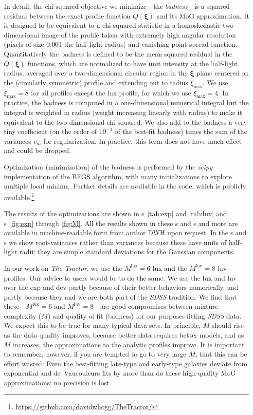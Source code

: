\documentclass[12pt,pdftex,preprint]{aastex}
\newcommand{\project}[1]{\textsl{#1}}
\newcommand{\tvector}[1]{\boldsymbol{#1}}
\newcommand{\spos}{\tvector{\xi}}
\newcommand{\lux}{\mathrm{lux}}
\newcommand{\luv}{\mathrm{luv}}
\begin{document}
In detail, the chi-squared objective we minimize---the
\emph{badness}---is a squared residual between the exact profile
function $Q(\spos)$ and its MoG approximation.  It is designed to be
equivalent to a chi-squared statistic in a homoskedastic
two-dimensional image of the profile taken with extremely high angular
resolution (pixels of size 0.001 the half-light radius) and vanishing
point-spread function.  Quantitatively the badness is defined to be
the mean squared residual in the $Q(\spos)$ functions, which are
normalized to have unit intensity at the half-light radius, averaged
over a two-dimensional circular region in the $\spos$ plane centered
on the (circularly symmetric) profile and extending out to radius
$\xi_{\max}$.  We use $\xi_{\max}=8$ for all profiles except the
$\lux$ profile, for which we use $\xi_{\max}=4$.  In practice, the
badness is computed in a one-dimensional numerical integral but the
integral is weighted in radius (weight increasing linearly with
radius) to make it equivalent to the two-dimensional chi-squared.  We
also add to the badness a very tiny coefficient (on the order of
$10^{-3}$ of the best-fit badness) times the sum of the variances
$v_m$ for regularization.  In practice, this term does not have much
effect and could be dropped.

Optimization (minimization) of the badness is performed by the
\project{scipy} implementation of the BFGS algorithm, with many
initializations to explore multiple local minima.  Further details are
available in the code, which is publicly
available.\footnote{\url{https://github.com/davidwhogg/TheTractor/}}

The results of the optimizations are shown in \tablename
s~\ref{tab:exp} and \ref{tab:lux} and \figurename s~\ref{fig:exp}
through \ref{fig:M}.  All the results shown in these \figurename s and
\tablename s and more are available in machine-readable form from author DWH
upon request.  In the \tablename s and \figurename s we show
root-variances rather than variances because these have units of
half-light radii; they are simple standard deviations for the Gaussian
components.

In our work on \project{The Tractor}, we use the $M^{\lux}=6$ lux and
the $M^{\luv}=8$ luv profiles.  Our advice to users would be to do the
same.  We use the lux and luv over the exp and dev partly because of
their better behaviors numerically, and partly because they and we are
both part of the \project{SDSS} tradition.  We find that
these---$M^{\lux}=6$ and $M^{\luv}=8$---are good compromises between
mixture complexity ($M$) and quality of fit (badness) for our purposes
fitting \project{SDSS} data.  We expect this to be true for many
typical data sets.  In principle, $M$ should rise as the data quality
improves, because better data requires better models, and as $M$
increases, the approximations to the analytic profiles improve.  It is
important to remember, however, if you are tempted to go to very large
$M$, that this can be effort wasted: Even the best-fitting late-type
and early-type galaxies deviate from exponential and de~Vaucouleurs
fits by more than do these high-quality MoG approximations; no
precision is lost.
\end{document}
